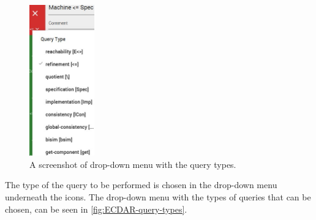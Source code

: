 \begin{figure}[H]
    \centering
    \includegraphics[width=0.25\textwidth]{common/figures/check-type.jpg}
    \caption{A screenshot of drop-down menu with the query types.}
    \label{fig:ECDAR-query-types}
\end{figure}

The type of the query to be performed is chosen in the drop-down menu underneath the icons. 
The drop-down menu with the types of queries that can be chosen, can be seen in \autoref{fig:ECDAR-query-types}.


